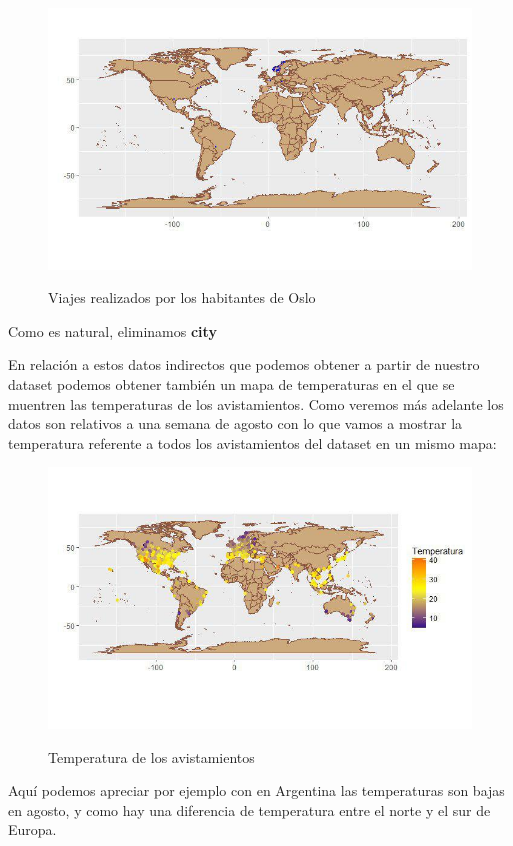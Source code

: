 \begin{figure}[H] %
\centering
\includegraphics[scale=0.8]{img/oslo.jpg}  %
\label{img/oslo.jpg}
\caption{Viajes realizados por los habitantes de Oslo}
\end{figure}

Como es natural, eliminamos \textbf{city}  

En relación a estos datos indirectos que podemos obtener a partir de nuestro dataset podemos obtener también un mapa de temperaturas en el que se muentren las temperaturas de los avistamientos. Como veremos más adelante los datos son relativos a una semana de agosto con lo que vamos a mostrar la temperatura referente a todos los avistamientos del dataset en un mismo mapa:

\begin{figure}[H] %
\centering
\includegraphics[scale=0.8]{img/temperatura.jpg}  %
\label{img/temperatura.jpg}
\caption{Temperatura de los avistamientos}
\end{figure}

Aquí podemos apreciar por ejemplo con en Argentina las temperaturas son bajas en agosto, y como hay una diferencia de temperatura entre el norte y el sur de Europa.









